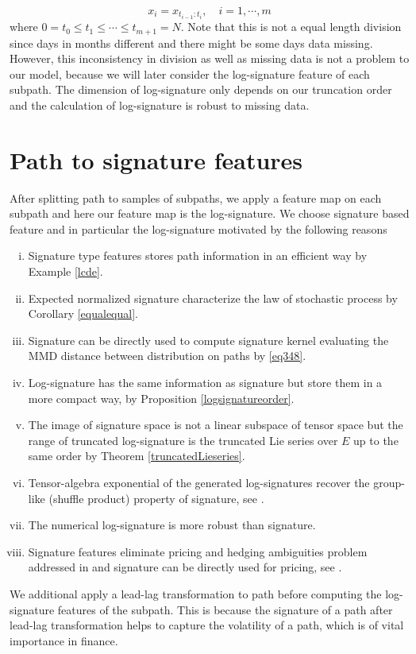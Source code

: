 \documentclass[12pt]{report}
\theoremstyle{definition}
\theoremstyle{remark}
\begin{document}
\begin{equation*}
  x_{i} = x_{t_{i-1}:t_{i}}, \quad i = 1,\cdots,m
\end{equation*}
where $0 = t_{0} \leq t_{1} \leq \cdots \leq t_{m+1} = N$. Note that this is not a equal length division since days in months different and there might be some days data missing. However, this inconsistency in division as well as missing data is not a problem to our model, because we will later consider the log-signature feature of each subpath. The dimension of log-signature only depends on our truncation order and the calculation of log-signature is robust to missing data. 
\section{Path to signature features}
After splitting path to samples of subpaths, we apply a feature map on each subpath and here our feature map is the log-signature. We choose signature based feature and in particular the log-signature motivated by the following reasons
\begin{enumerate}[(i)]
  \item Signature type features stores path information in an efficient way by Example \ref{lcde}.
  \item Expected normalized signature characterize the law of stochastic process by Corollary \ref{equalequal}.
  \item Signature can be directly used to compute signature kernel evaluating the MMD distance between distribution on paths by \eqref{eq348}.
  \item Log-signature has the same information as signature but store them in a more compact way, by Proposition \ref{logsignatureorder}. 
  \item The image of signature space is not a linear subspace of tensor space but the range of truncated log-signature is the truncated Lie series over $E$ up to the same order by Theorem \ref{truncatedLieseries}.
  \item Tensor-algebra exponential of the generated log-signatures recover the group-like (shuffle product) property of signature, see \cite{lyons2007differential}.
  \item The numerical log-signature is more robust than signature. 
  \item Signature features eliminate pricing and hedging ambiguities problem addressed in and signature can be directly used for pricing, see \cite{brigo2019probability}.
\end{enumerate} 
We additional apply a lead-lag transformation \cite{flint2016discretely} to path before computing the log-signature features of the subpath. This is because the signature of a path after lead-lag transformation helps to capture the volatility of a path, which is of vital importance in finance. 
\end{document}
